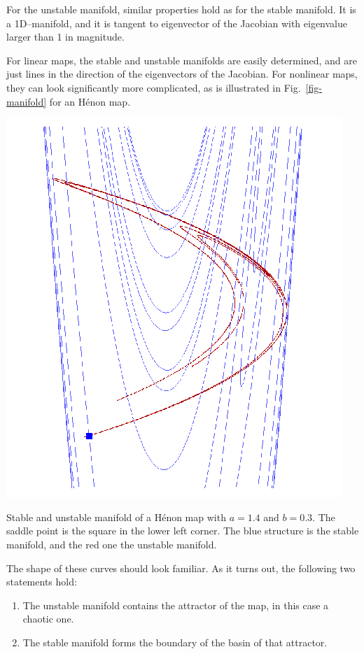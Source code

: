 For the unstable manifold, similar properties hold as for the stable manifold. It is a 1D--manifold, and it is tangent to eigenvector of the Jacobian with eigenvalue larger than 1 in magnitude.

For linear maps, the stable and unstable manifolds are easily determined, and are just lines in the direction of the eigenvectors of the Jacobian. For nonlinear maps, they can look significantly more complicated, as is illustrated in Fig.~\ref{fig-manifold} for an H\'{e}non map. 

\begin{marginfigure}
\centering
\includegraphics{dynamic/figures/manifold}
\caption{Stable and unstable manifold of a H\'{e}non map with $a=1.4$ and $b=0.3$. The saddle point is the square in the lower left corner. The blue structure is the stable manifold, and the red one the unstable manifold.}
\label{fig-manifold}
\end{marginfigure} 

The shape of these curves should look familiar. As it turns out, the following two statements hold:

\begin{enumerate}
\item
The unstable manifold contains the attractor of the map, in this case a chaotic one.
\item
The stable manifold forms the boundary of the basin of that attractor.

\end{enumerate}

